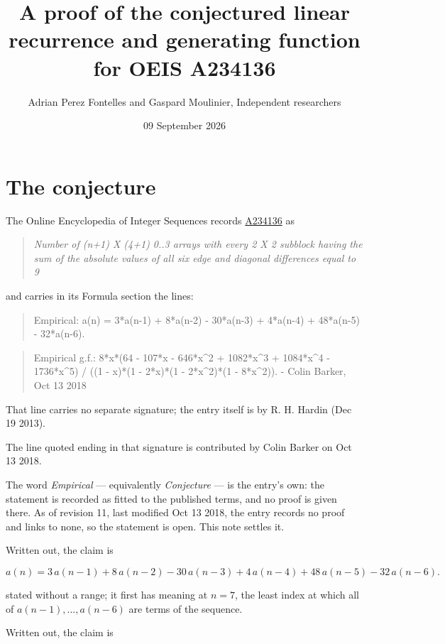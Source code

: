 \documentclass[11pt]{article}
\title{A proof of the conjectured linear recurrence and generating function for OEIS A234136}
\author{Adrian Perez Fontelles and Gaspard Moulinier, Independent researchers}
\date{09 September 2026}
\theoremstyle{definition}
\begin{document}
\maketitle
\section{The conjecture}

The Online Encyclopedia of Integer Sequences records \href{https://oeis.org/A234136}{A234136} as

\begin{quote}\itshape Number of (n+1) X (4+1) 0..3 arrays with every 2 X 2 subblock having the sum of the absolute values of all six edge and diagonal differences equal to 9\end{quote}

and carries in its Formula section the lines:

\begin{quote}\ttfamily Empirical: a(n) = 3*a(n-1) + 8*a(n-2) - 30*a(n-3) + 4*a(n-4) + 48*a(n-5) - 32*a(n-6).\end{quote}

\begin{quote}\ttfamily Empirical g.f.: 8*x*(64 - 107*x - 646*x\textasciicircum{}2 + 1082*x\textasciicircum{}3 + 1084*x\textasciicircum{}4 - 1736*x\textasciicircum{}5) / ((1 - x)*(1 - 2*x)*(1 - 2*x\textasciicircum{}2)*(1 - 8*x\textasciicircum{}2)). - Colin Barker, Oct 13 2018\end{quote}

That line carries no separate signature; the entry itself is by R. H. Hardin (Dec 19 2013).

The line quoted ending in that signature is contributed by Colin Barker on Oct 13 2018.

The word {\itshape Empirical} --- equivalently {\itshape Conjecture} --- is the entry's own: the statement is recorded as fitted to the published terms, and no proof is given there. As of revision 11, last modified Oct 13 2018, the entry records no proof and links to none, so the statement is open. This note settles it.

Written out, the claim is

\[a(n) = 3\,a(n-1) + 8\,a(n-2) - 30\,a(n-3) + 4\,a(n-4) + 48\,a(n-5) - 32\,a(n-6).\]

stated without a range; it first has meaning at $n = 7$, the least index at which all of $a(n-1),\dots,a(n-6)$ are terms of the sequence.

Written out, the claim is
\end{document}
